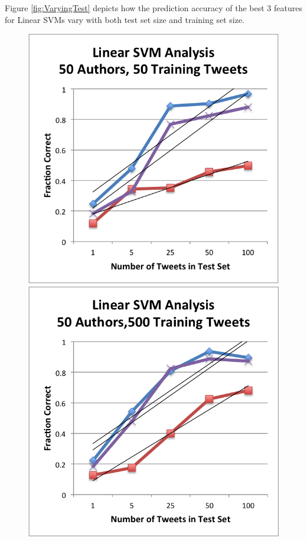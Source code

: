 \documentclass[pageno]{jpaper}
\begin{document}
Figure \ref{fig:VaryingTest} depicts how the prediction accuracy of the best 3 features for Linear SVMs vary with both test set size and training set size.
\begin{figure}[h!]
\begin{center}
\includegraphics*[scale=.75]{LinearSVMVaryTest50Auth50Train}
\includegraphics*[scale=.75]{LinearSVMVaryTest50Auth500Train}

\end{center}
\end{figure}
\end{document}
